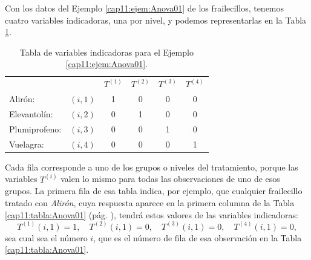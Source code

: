 \begin{ejemplo}
\label{cap11:ejem:TablaVariablesIndicadoras}

Con los datos del Ejemplo \ref{cap11:ejem:Anova01} de los frailecillos, tenemos cuatro variables
indicadoras, una por nivel, y podemos representarlas en la Tabla
\ref{cap11:tabla:variablesIndicadorasEjemploAnova01}.


\begin{table}[ht]
\begin{center}
\begin{tabular}{lc|c|c|c|c|}
\cline{3-6}
               & &$T^{(1)}$&$T^{(2)}$&$T^{(3)}$&$T^{(4)}$ \\
\cline{2-6}
\mbox{Alirón:}&\multicolumn{1}{|c|}{ $(i,1)$}&1&0&0&0 \\
\cline{2-6}
\mbox{Elevantolín:}&\multicolumn{1}{|c|}{ $(i,2)$}&0&1&0&0 \\
\cline{2-6}
\mbox{Plumiprofeno:}&\multicolumn{1}{|c|}{ $(i,3)$}&0&0&1&0 \\
\cline{2-6}
\mbox{Vuelagra:}&\multicolumn{1}{|c|}{ $(i,4)$}&0&0&0&1 \\
\cline{2-6}
\end{tabular}
\end{center}
\caption{Tabla de variables indicadoras para el Ejemplo \ref{cap11:ejem:Anova01}.}
\label{cap11:tabla:variablesIndicadorasEjemploAnova01}
\end{table}

Cada fila corresponde a uno de los grupos o niveles del tratamiento, porque las variables $T^{(i)}$ valen lo mismo para todas las observaciones de uno de esos grupos.  La primera fila de esa tabla indica, por ejemplo, que cualquier frailecillo tratado con {\em Alirón}, cuya respuesta aparece en la primera columna de la Tabla \ref{cap11:tabla:Anova01} (pág. \pageref{cap11:tabla:Anova01}), tendrá estos valores de las variables indicadoras:
\[T^{(1)}(i,1)=1,\quad T^{(2)}(i,1)=0,\quad T^{(3)}(i,1)=0,\quad T^{(4)}(i,1)=0,\]
 sea cual sea el número $i$, que es el número de fila de esa observación en la Tabla \ref{cap11:tabla:Anova01}.


\end{ejemplo}
